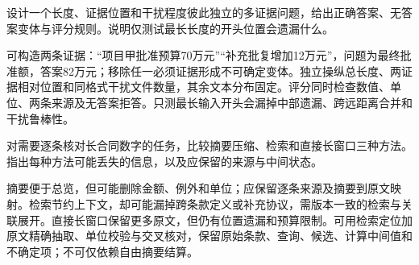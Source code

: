 \begin{exercises}
\begin{exercise} 设计一个长度、证据位置和干扰程度彼此独立的多证据问题，给出正确答案、无答案变体与评分规则。说明仅测试最长长度的开头位置会遗漏什么。

\begin{solution}
可构造两条证据：“项目甲批准预算70万元”“补充批复增加12万元”，问题为最终批准额，答案82万元；移除任一必须证据形成不可确定变体。独立操纵总长度、两证据相对位置和同格式干扰文件数量，其余文本分布固定。评分同时检查数值、单位、两条来源及无答案拒答。只测最长输入开头会漏掉中部遗漏、跨远距离合并和干扰鲁棒性。
\end{solution}
\end{exercise}

\begin{exercise} 对需要逐条核对长合同数字的任务，比较摘要压缩、检索和直接长窗口三种方法。指出每种方法可能丢失的信息，以及应保留的来源与中间状态。

\begin{solution}
摘要便于总览，但可能删除金额、例外和单位；应保留逐条来源及摘要到原文映射。检索节约上下文，却可能漏掉跨条款定义或补充协议，需版本一致的检索与关联展开。直接长窗口保留更多原文，但仍有位置遗漏和预算限制。可用检索定位加原文精确抽取、单位校验与交叉核对，保留原始条款、查询、候选、计算中间值和不确定项；不可仅依赖自由摘要结算。
\end{solution}
\end{exercise}

\end{exercises}
